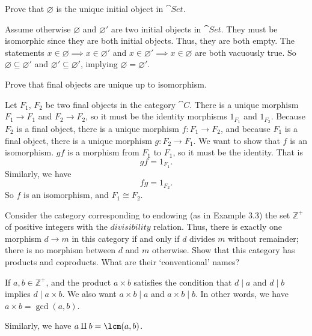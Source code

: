 \documentclass[parskip=full, draft]{scrartcl}
\begin{document}
\begin{prob}{2}
    Prove that \(\varnothing\) is the unique initial object in \(\cat{Set}\).
\end{prob}
\begin{sol}
    Assume otherwise \(\varnothing\) and \(\varnothing'\) are two initial objects in \(\cat{Set}\). They must be isomorphic since they are both initial objects. Thus, they are both empty. The statements \(x \in \varnothing \implies x \in \varnothing'\) and \(x \in \varnothing' \implies x \in \varnothing\) are both vacuously true. So \(\varnothing \subseteq \varnothing'\) and \(\varnothing' \subseteq \varnothing'\), implying \(\varnothing = \varnothing'\).
\end{sol}
\begin{prob}{3}
    Prove that final objects are unique up to isomorphism.
\end{prob}
\begin{sol}
    Let \(F_1\), \(F_2\) be two final objects in the category \(\cat{C}\). There is a unique morphism \(F_1 \to F_1\) and \(F_2 \to F_2\), so it must be the identity morphisms \(1_{F_1}\) and \(1_{F_2}\). Because \(F_2\) is a final object, there is a unique morphism \(f: F_1 \to F_2\), and because \(F_1\) is a final object, there is a unique morphism \(g: F_2 \to F_1\). We want to show that \(f\) is an isomorphism. \(gf\) is a morphism from \(F_1\) to \(F_1\), so it must be the identity. That is
    \[
        gf = 1_{F_1}.
    \]
    Similarly, we have
    \[
        fg = 1_{F_2}.
    \]
    So \(f\) is an isomorphism, and \(F_1 \cong F_2\).
\end{sol}
\begin{prob}{6}
    Consider the category corresponding to endowing (as in Example 3.3) the set \(\mathbb{Z}^+\) of positive integers with the \(divisibility\) relation. Thus, there is exactly one morphism \(d \to m\) in this category if and only if \(d\) divides \(m\) without remainder; there is no morphism between \(d\) and \(m\) otherwise. Show that this category has products and coproducts. What are their `conventional' names?
\end{prob}
\begin{sol}
    If \(a, b \in \mathbb{Z}^+\), and the product \(a \times b\) satisfies the condition that \(d \mid a\) and \(d \mid b\) implies \(d \mid a \times b\). We also want \(a \times b \mid a\) and \(a \times b \mid b\). In other words, we have \(a \times b = \gcd(a, b)\).
    
    Similarly, we have \(a \amalg b = \lcm(a, b)\).
\end{sol}
\end{document}
